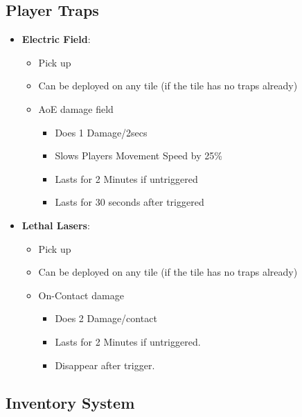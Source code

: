 \documentclass[10pt]{report}
\begin{document}
\subsection{Player Traps}

\begin{itemize}
    \item \textbf{Electric Field}:
    \begin{itemize}
        \item Pick up
        \item Can be deployed on any tile (if the tile has no traps already)
        \item AoE damage field
        \begin{itemize}
            \item Does 1 Damage/2secs
            \item Slows Players Movement Speed by 25\%
            \item Lasts for 2 Minutes if untriggered
            \item Lasts for 30 seconds after triggered
        \end{itemize}
    \end{itemize}
    \item \textbf{Lethal Lasers}:
    \begin{itemize}
        \item Pick up
        \item Can be deployed on any tile (if the tile has no traps already)
        \item On-Contact damage
        \begin{itemize}
            \item Does 2 Damage/contact
            \item Lasts for 2 Minutes if untriggered.
            \item Disappear after trigger.
        \end{itemize}
    \end{itemize}
\end{itemize}

\subsection{Inventory System}
\end{document}
